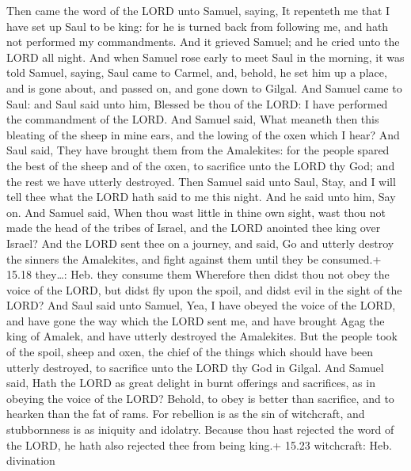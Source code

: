  Then came the word of the LORD unto Samuel, saying,
 It repenteth me that I have set up Saul to be king: for he
is turned back from following me, and hath not performed my
commandments. And it grieved Samuel; and he cried unto the LORD all
night.  And when Samuel rose early to meet Saul in the
morning, it was told Samuel, saying, Saul came to Carmel, and, behold,
he set him up a place, and is gone about, and passed on, and gone down
to Gilgal.  And Samuel came to Saul: and Saul said unto
him, Blessed be thou of the LORD: I have performed the commandment of
the LORD.  And Samuel said, What meaneth then this bleating
of the sheep in mine ears, and the lowing of the oxen which I hear?
 And Saul said, They have brought them from the Amalekites:
for the people spared the best of the sheep and of the oxen, to
sacrifice unto the LORD thy God; and the rest we have utterly destroyed.
 Then Samuel said unto Saul, Stay, and I will tell thee
what the LORD hath said to me this night. And he said unto him, Say on.
 And Samuel said, When thou wast little in thine own sight,
wast thou not made the head of the tribes of Israel, and the LORD
anointed thee king over Israel?  And the LORD sent thee on
a journey, and said, Go and utterly destroy the sinners the Amalekites,
and fight against them until they be consumed.+ 15.18 they\ldots: Heb.
they consume them  Wherefore then didst thou not obey the
voice of the LORD, but didst fly upon the spoil, and didst evil in the
sight of the LORD?  And Saul said unto Samuel, Yea, I have
obeyed the voice of the LORD, and have gone the way which the LORD sent
me, and have brought Agag the king of Amalek, and have utterly destroyed
the Amalekites.  But the people took of the spoil, sheep
and oxen, the chief of the things which should have been utterly
destroyed, to sacrifice unto the LORD thy God in Gilgal. 
And Samuel said, Hath the LORD as great delight in burnt offerings and
sacrifices, as in obeying the voice of the LORD? Behold, to obey is
better than sacrifice, and to hearken than the fat of rams.
 For rebellion is as the sin of witchcraft, and
stubbornness is as iniquity and idolatry. Because thou hast rejected the
word of the LORD, he hath also rejected thee from being king.+ 15.23
witchcraft: Heb. divination


